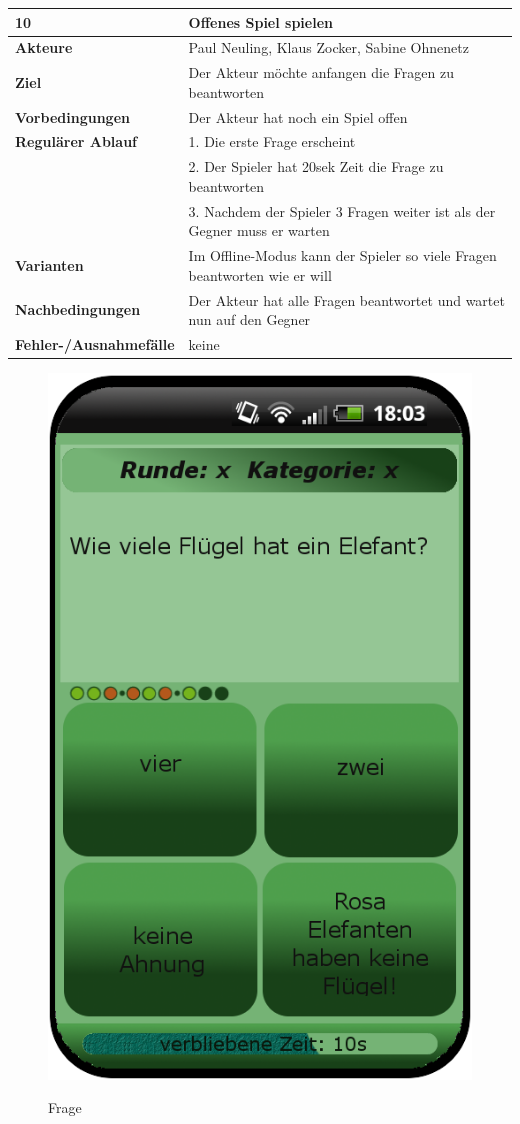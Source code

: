 \documentclass[fontsize=12pt,paper=a4,twoside]{scrartcl}
\begin{document}
\begin{table}
	[H] \label{10} 
	\begin{tabular}
		{|l|p{10cm}|} \hline \textbf{10} & \textbf{Offenes Spiel spielen} \\
		\hline \textbf{Akteure} & Paul Neuling, Klaus Zocker, Sabine Ohnenetz\\
		\hline \textbf{Ziel} & Der Akteur möchte anfangen die Fragen zu beantworten\\
		\hline \textbf{Vorbedingungen} & Der Akteur hat noch ein Spiel offen\\
		\hline \textbf{Regulärer Ablauf} & 1. Die erste Frage erscheint\\
		&2. Der Spieler hat 20sek Zeit die Frage zu beantworten\\
		&3. Nachdem der Spieler 3 Fragen weiter ist als der Gegner muss er warten\\
		\hline \textbf{Varianten} & Im Offline-Modus kann der Spieler so viele Fragen beantworten wie er will \\
		\hline \textbf{Nachbedingungen} & Der Akteur hat alle Fragen beantwortet und wartet nun auf den Gegner\\
		\hline \textbf{Fehler-/Ausnahmefälle} & keine \\
		\hline 
	\end{tabular}
\end{table}

\begin{figure}
	[H] \caption{Frage} 
	\includegraphics[width=0.5
	\textwidth]{Bilder/QuizzQuestion.png} \label{pic:ques} 
\end{figure}
\end{document}

